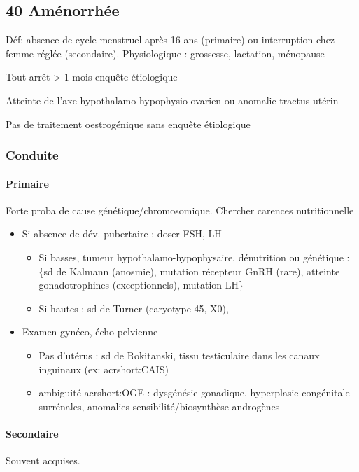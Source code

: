 \documentclass[11pt]{article}
\begin{document}
\subsection{40 \textdagger{} Aménorrhée}
\label{sec:org528f07c}
Déf: absence de cycle menstruel après 16 ans (primaire) ou interruption chez
femme réglée (secondaire). Physiologique : grossesse, lactation, ménopause

Tout arrêt > 1 mois \thus enquête étiologique \danger

Atteinte de l'axe hypothalamo-hypophysio-ovarien ou anomalie tractus utérin

\begin{tcolorbox}
Pas de traitement oestrogénique sans enquête étiologique
\end{tcolorbox}

\subsubsection{Conduite}
\label{sec:orgcfc0f91}
\paragraph{Primaire}
\label{sec:orgec73915}
Forte proba de cause génétique/chromosomique. Chercher carences nutritionnelle

\begin{itemize}
\item Si absence de dév. pubertaire : doser FSH, LH
\begin{itemize}
\item Si basses, tumeur hypothalamo-hypophysaire, dénutrition ou génétique : \{sd
de Kalmann (anosmie), mutation récepteur GnRH (rare), atteinte
gonadotrophines (exceptionnels), mutation LH\}
\item Si hautes : sd de Turner (caryotype 45, X0),
\end{itemize}
\item Examen gynéco, écho pelvienne
\begin{itemize}
\item Pas d'utérus : sd de Rokitanski, tissu testiculaire dans les canaux
inguinaux (ex: acrshort:CAIS)
\item ambiguité acrshort:OGE : dysgénésie gonadique, hyperplasie congénitale surrénales,
anomalies sensibilité/biosynthèse androgènes
\end{itemize}
\end{itemize}
\paragraph{Secondaire}
\label{sec:org7e3bd87}
Souvent acquises. 
\end{document}
